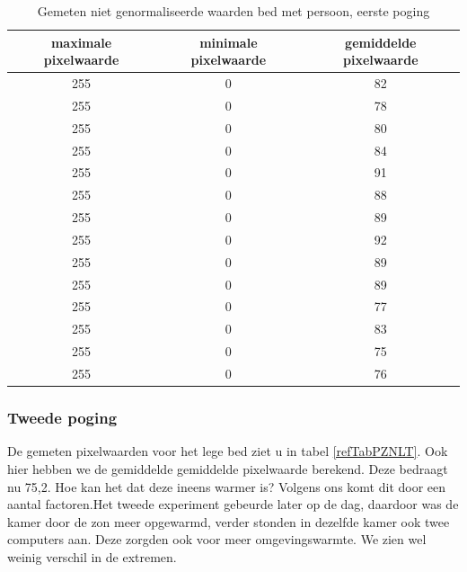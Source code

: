 \begin{table}[h]
	\begin{tabular}{|c|c|c|}
		\hline
		maximale pixelwaarde & minimale pixelwaarde & gemiddelde pixelwaarde \\ \hline
		255 & 0 & 82 \\ \hline
		255 & 0 & 78 \\ \hline
		255 & 0 & 80 \\ \hline
		255 & 0 & 84 \\ \hline
		255 & 0 & 91 \\ \hline
		255 & 0 & 88 \\ \hline
		255 & 0 & 89 \\ \hline
		255 & 0 & 92 \\ \hline
		255 & 0 & 89 \\ \hline
		255 & 0 & 89 \\ \hline
		255 & 0 & 77 \\ \hline
		255 & 0 & 83 \\ \hline
		255 & 0 & 75 \\ \hline
		255 & 0 & 76 \\ \hline
	\end{tabular}
	\caption{Gemeten niet genormaliseerde waarden bed met persoon, eerste poging}
	\label{refTabPZNP}
\end{table}

\subsubsection{Tweede poging}
De gemeten pixelwaarden voor het lege bed ziet u in tabel \ref{refTabPZNLT}. Ook hier hebben we de gemiddelde gemiddelde pixelwaarde berekend. Deze bedraagt nu 75,2. Hoe kan het dat deze ineens warmer is? Volgens ons komt dit door een aantal factoren.Het tweede experiment gebeurde later op de dag, daardoor was de kamer door de zon meer opgewarmd, verder stonden in dezelfde kamer ook twee computers aan. Deze zorgden ook voor meer omgevingswarmte. We zien wel weinig verschil in de extremen. 

